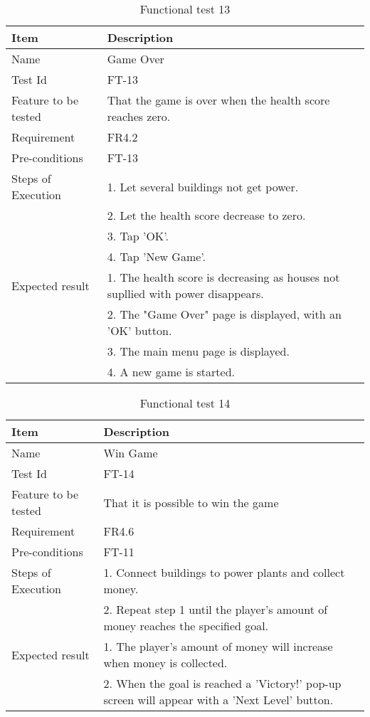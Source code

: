 \begin{table}[H]
\centering
	\begin{tabular}{ l | p{8cm} }
		\hline
		{\bf Item} & {\bf Description} \\ \hline
		Name & Game Over \\ 
		Test Id & FT-13 \\ 
		Feature to be tested & That the game is over when the health score reaches zero. \\ 
		Requirement & FR4.2 \\ 
		Pre-conditions & FT-13 \\ 
		Steps of Execution & 1. Let several buildings not get power. \\ 
		& 2. Let the health score decrease to zero. \\
		& 3. Tap 'OK'. \\
		& 4. Tap 'New Game'. \\
		Expected result & 1. The health score is decreasing as houses not supllied with power disappears. \\
		& 2. The "Game Over" page is displayed, with an 'OK' button. \\
		& 3. The main menu page is displayed. \\
		& 4. A new game is started. \\
	\end{tabular}
	\caption{Functional test 13}
\end{table}

\begin{table}[H]
\centering
	\begin{tabular}{ l | p{8cm} }
		\hline
		{\bf Item} & {\bf Description} \\ \hline
		Name & Win Game \\ 
		Test Id & FT-14 \\ 
		Feature to be tested & That it is possible to win the game \\ 
		Requirement & FR4.6 \\ 
		Pre-conditions & FT-11 \\ 
		Steps of Execution & 1. Connect buildings to power plants and collect money. \\ 
		& 2. Repeat step 1 until the player's amount of money reaches the specified goal. \\
		Expected result & 1. The player's amount of money will increase when money is collected. \\ 
		& 2. When the goal is reached a 'Victory!' pop-up screen will appear with a 'Next Level' button. \\
	\end{tabular}
	\caption{Functional test 14}
\end{table}

